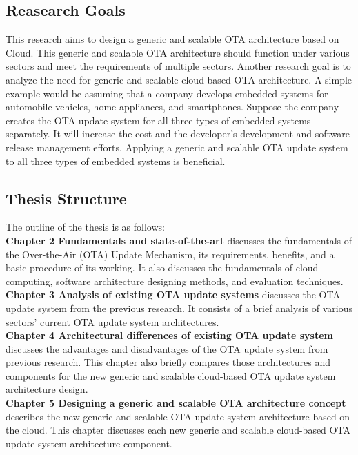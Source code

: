 \documentclass[12pt,a4paper]{article}
\begin{document}
\subsection{Reasearch Goals}

This research aims to design a generic and scalable OTA architecture based on Cloud. This generic and scalable OTA architecture should function under various sectors and meet the requirements of multiple sectors. Another research goal is to analyze the need for generic and scalable cloud-based OTA architecture. A simple example would be assuming that a company develops embedded systems for automobile vehicles, home appliances, and smartphones. Suppose the company creates the OTA update system for all three types of embedded systems separately. It will increase the cost and the developer's development and software release management efforts. Applying a generic and scalable OTA update system to all three types of embedded systems is beneficial.


\subsection{Thesis Structure}

The outline of the thesis is as follows: \\

\textbf{Chapter 2 Fundamentals and state-of-the-art} discusses the fundamentals of the Over-the-Air (OTA) Update Mechanism, its requirements, benefits, and a basic procedure of its working. It also discusses the fundamentals of cloud computing, software architecture designing methods, and evaluation techniques. \\

\textbf{Chapter 3 Analysis of existing OTA update systems} discusses the OTA update system from the previous research. It consists of a brief analysis of various sectors' current OTA update system architectures.  \\

\textbf{Chapter 4 Architectural differences of existing OTA update system} discusses the advantages and disadvantages of the OTA update system from previous research. This chapter also briefly compares those architectures and components for the new generic and scalable cloud-based OTA update system architecture design. \\

\textbf{Chapter 5 Designing a generic and scalable OTA architecture concept} describes the new generic and scalable OTA update system architecture based on the cloud. This chapter discusses each new generic and scalable cloud-based OTA update system architecture component. \\
\end{document}
